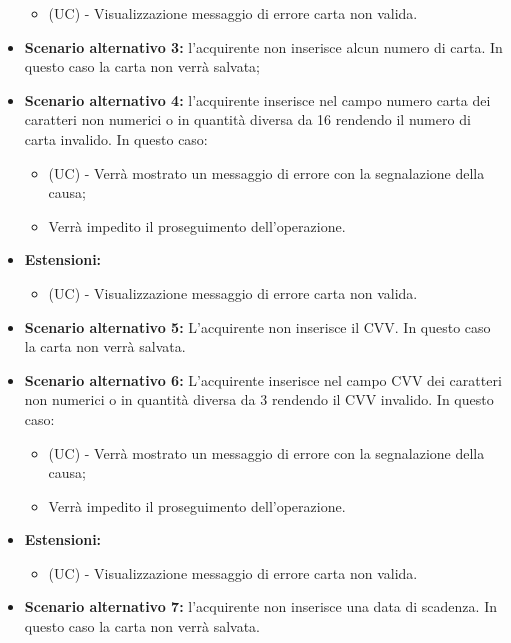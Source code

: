 \begin{itemize}
    \begin{itemize}
        \item (UC) - Visualizzazione messaggio di errore carta non valida.
    \end{itemize}
    \item \textbf{Scenario alternativo 3:} l'acquirente non inserisce alcun numero di carta. In questo caso la carta non verrà salvata;
    \item \textbf{Scenario alternativo 4:} l'acquirente inserisce nel campo numero carta dei caratteri non numerici o in quantità diversa da 16 rendendo il numero di carta invalido. In questo caso:
    \begin{itemize}
        \item (UC) - Verrà mostrato un messaggio di errore con la segnalazione della causa;
        \item Verrà impedito il proseguimento dell'operazione.
    \end{itemize}
    \item \textbf{Estensioni:}
    \begin{itemize}
        \item (UC) - Visualizzazione messaggio di errore carta non valida.
    \end{itemize}
    \item \textbf{Scenario alternativo 5:} L'acquirente non inserisce il CVV. In questo caso la carta non verrà salvata.
    \item \textbf{Scenario alternativo 6:} L'acquirente inserisce nel campo CVV dei caratteri non numerici o in quantità diversa da 3 rendendo il CVV invalido. In questo caso:
    \begin{itemize}
        \item (UC) - Verrà mostrato un messaggio di errore con la segnalazione della causa;
        \item Verrà impedito il proseguimento dell'operazione.
    \end{itemize}
    \item \textbf{Estensioni:}
    \begin{itemize}
        \item (UC) - Visualizzazione messaggio di errore carta non valida.
    \end{itemize}
    \item \textbf{Scenario alternativo 7:} l'acquirente non inserisce una data di scadenza. In questo caso la carta non verrà salvata.
\end{itemize}

